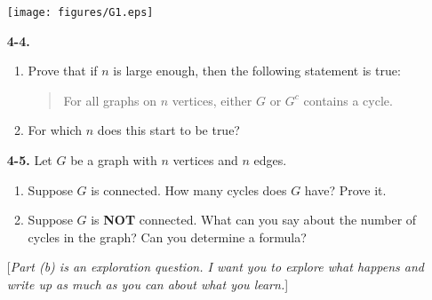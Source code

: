 \documentclass[12pt]{article}
\begin{document}
\begin{enumerate}
\begin{center}
\texttt{[image: figures/G1.eps]}
\end{center}

\item[\bf 4-4.]
\begin{enumerate}
\item Prove that if $n$ is large enough, then the following statement is true:  
\begin{quote}For all graphs on $n$ vertices, either $G$ or $G^c$ contains a cycle.
\end{quote}
\item For which $n$ does this start to be true?
\end{enumerate}


\item[\bf 4-5.] Let $G$ be a graph with $n$ vertices and $n$ edges.
\begin{enumerate}
\item Suppose $G$ is connected.  How many cycles does $G$ have?  Prove it.  
\item Suppose $G$ is {\bf NOT} connected.  What can you say about the number of cycles in the graph?  Can you determine a formula? 
\end{enumerate}
[{\em Part \textup{(b)} is an exploration question.  I want you to explore what happens and write up as much as you can about what you learn.}]

\end{enumerate}
\end{document}

